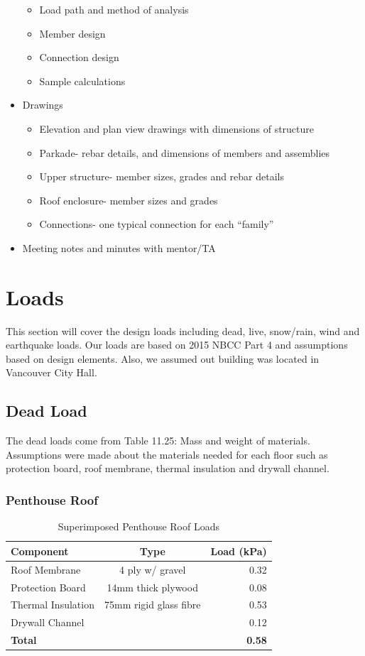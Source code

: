 \documentclass[12pt]{article}
\begin{document}
\begin{itemize}
\begin{itemize}
        \item Load path and method of analysis
        \item Member design
        \item Connection design
        \item Sample calculations
    \end{itemize}
    \item Drawings
    \begin{itemize}
        \item Elevation and plan view drawings with dimensions of structure
        \item Parkade- rebar details, and dimensions of members and assemblies
        \item Upper structure- member sizes, grades and rebar details
        \item Roof enclosure- member sizes and grades
        \item Connections- one typical connection for each “family”
    \end{itemize}
    \item Meeting notes and minutes with mentor/TA
\end{itemize}
\section{Loads}
This section will cover the design loads including dead, live, snow/rain, wind and earthquake loads.
 Our loads are based on 2015 NBCC Part 4 and assumptions based on design elements.
 Also, we assumed out building was located in Vancouver City Hall.
 \subsection{Dead Load}
 The dead loads come from Table 11.25: Mass and weight of materials.
 Assumptions were made about the materials needed for each floor such as protection board, roof membrane, thermal insulation and drywall channel.
\subsubsection{Penthouse Roof}
    \begin{table}[h!]
        \centering
    \begin{tabular}{lcr}
        \toprule
        \textbf{Component} & \textbf{Type} & \textbf{Load (kPa)}\\
        \midrule
        Roof Membrane & 4 ply w/ gravel & 0.32\\
        Protection Board & 14mm thick plywood & 0.08\\
        Thermal Insulation & 75mm rigid glass fibre & 0.53\\
        Drywall Channel & & 0.12\\
        \textbf{Total} & & \textbf{0.58}\\
        \bottomrule
    \end{tabular}
    \caption{Superimposed Penthouse Roof Loads}
    \label{tab:superPent}
    \end{table}
\end{document}
